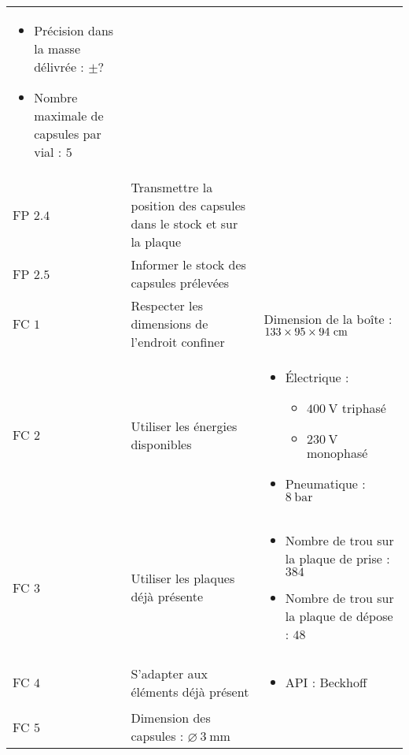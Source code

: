 \begin{longtable}{l|m{5cm}|m{5cm}}
\begin{itemize}
            \item Précision dans la masse délivrée : $\pm ?$
            \item Nombre maximale de capsules par vial : $5$
        \end{itemize}\\
        FP $2.4$&\centering Transmettre la position des capsules dans le stock et sur la plaque&\\
        FP $2.5$&\centering Informer le stock des capsules prélevées&\\
        FC $1$&\centering Respecter les dimensions de l'endroit confiner &Dimension de la boîte  : $\numproduct{133 x 95 x 94}~\unit{\cm}$\\
        FC $2$&\centering Utiliser les énergies disponibles& \begin{itemize}
            \item Électrique : \begin{itemize}
                \item $\qty{400}{\volt}$ triphasé
                \item $\qty{230}{\volt}$ monophasé
            \end{itemize}
            \item Pneumatique : $\qty{8}{\bar}$
        \end{itemize}\\ 
        FC $3$&\centering Utiliser les plaques déjà présente&\begin{itemize}
            \item Nombre de trou sur la plaque de prise : $384$
            \item Nombre de trou sur la plaque de dépose : $48$
        \end{itemize}\\
        FC $4$&\centering S'adapter aux éléments déjà présent&\begin{itemize}
            \item API : Beckhoff
        \end{itemize}\\
        FC $5$&\centering Dimension des capsules : $\varnothing~\qty{3}{\mm}$&

    \end{longtable}